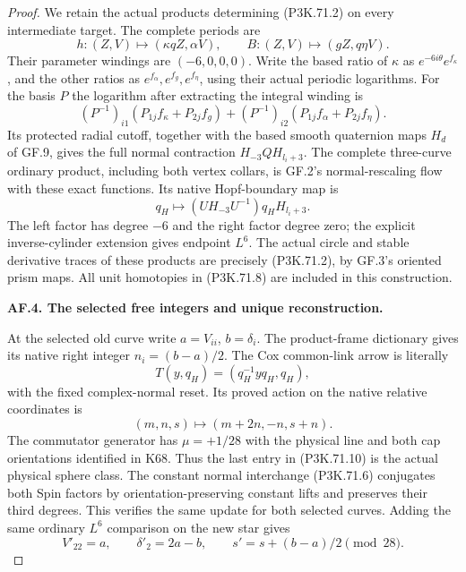 \begin{proof}
We retain the actual products determining (P3K.71.2) on every
intermediate target. The complete periods are
\[
 h:(Z,V)\mapsto(\kappa qZ,\alpha V),\qquad
 B:(Z,V)\mapsto(gZ,q\eta V).
\]
Their parameter windings are \((-6,0,0,0)\). Write the based
ratio of \(\kappa\) as \(e^{-6i\theta}e^{f_\kappa}\), and
the other ratios as \(e^{f_\alpha},e^{f_g},e^{f_\eta}\),
using their actual periodic logarithms. For the basis \(P\)
the logarithm after extracting the integral winding is
\[
 (P^{-1})_{i1}(P_{1j}f_\kappa+P_{2j}f_g)
 +(P^{-1})_{i2}(P_{1j}f_\alpha+P_{2j}f_\eta).
                                                            \tag{P3K.71.8}
\]
Its protected radial cutoff, together with the based smooth
quaternion maps \(H_d\) of GF.9, gives the full normal
contraction \(H_{-3}QH_{l_i+3}\). The complete three-curve
ordinary product, including both vertex collars, is GF.2's
normal-rescaling flow with these exact functions. Its native
Hopf-boundary map is
\[
 q_H\longmapsto (U H_{-3}U^{-1})q_HH_{l_i+3}.
                                                            \tag{P3K.71.9}
\]
The left factor has degree \(-6\) and the right factor
degree zero; the explicit inverse-cylinder extension gives
endpoint \(L^6\). The actual circle and stable derivative
traces of these products are precisely (P3K.71.2), by GF.3's
oriented prism maps. All unit homotopies in (P3K.71.8) are
included in this construction.

\par\medskip\noindent\textbf{AF.4. The selected free integers and unique reconstruction.}\par\nopagebreak[4]

At the selected old curve write \(a=V_{ii}\), \(b=\delta_i\).
The product-frame dictionary gives its native right integer
\(n_i=(b-a)/2\). The Cox common-link arrow is literally
\[
 T(y,q_H)=(q_H^{-1}yq_H,q_H),
\]
with the fixed complex-normal reset. Its proved action on
the native relative coordinates is
\[
 (m,n,s)\longmapsto(m+2n,-n,s+n).                    \tag{P3K.71.10}
\]
The commutator generator has \(\mu=+1/28\) with the physical
line and both cap orientations identified in K68. Thus the
last entry in (P3K.71.10) is the actual physical sphere class.
The constant normal interchange (P3K.71.6) conjugates both
Spin factors by orientation-preserving constant lifts and
preserves their third degrees. This verifies the same update
for both selected curves. Adding the same ordinary \(L^6\)
comparison on the new star gives
\[
 V'_{22}=a,\qquad\delta'_2=2a-b,\qquad
 s'=s+(b-a)/2\pmod{28}.                             \tag{P3K.71.11}
\]


\end{proof}

